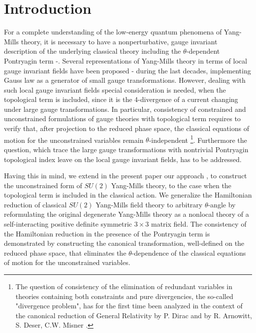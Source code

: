 \documentclass[a4paper,12pt]{article}
\begin{document}
\newpage

\bigskip


\section{Introduction}


For a complete understanding of the low-energy quantum phenomena
of Yang-Mills theory, it is necessary to have a nonperturbative,
gauge invariant description of the underlying classical theory
including the $\theta$-dependent Pontryagin term \cite{JackiwRebbi}-\cite{Jackiw}.
Several representations of Yang-Mills theory in terms of local gauge
invariant fields
have been proposed \cite{GoldJack}-\cite{Majumdar} during the last decades,
implementing Gauss law as a generator of small gauge transformations.
However, dealing with such local gauge invariant fields
special consideration is needed, when the topological term is included,
since it is the 4-divergence of a current
changing under large gauge transformations. In particular,
consistency of constrained and unconstrained formulations of gauge
theories with topological term requires to verify that, after projection
to the reduced phase space, the classical equations of motion for
the unconstrained variables remain $\theta$-independent
\footnote{
The question of consistency of the elimination of redundant variables
in theories containing both constraints and pure divergencies,
the so-called "divergence problem", has for the first time been analyzed
in the context of the canonical reduction of General Relativity
by P. Dirac \cite{Dirac} and by R. Arnowitt, S. Deser, C.W. Misner \cite{ADM}.
}.
Furthermore the question, which trace the large gauge transformations
with nontrivial Pontryagin topological index leave on the local gauge
invariant fields, has to be addressed.

Having this in mind, we extend in the present paper our approach
\cite{KP,AHG,KMPR}, to construct the unconstrained form of
$SU(2)$ Yang-Mills theory, to the case when the topological term is included
in the classical action.
We generalize the Hamiltonian reduction of classical $SU(2)$ Yang-Mills
field theory to arbitrary $\theta$-angle
by reformulating the original degenerate
Yang-Mills theory as a nonlocal theory of a self-interacting
positive definite symmetric $3\times 3$ matrix field.
The consistency of the Hamiltonian reduction in the presence of the
Pontryagin term is demonstrated by constructing
the canonical transformation, well-defined on the reduced phase space,
that eliminates the $\theta$-dependence of the classical equations of motion
for the unconstrained variables.
\end{document}
